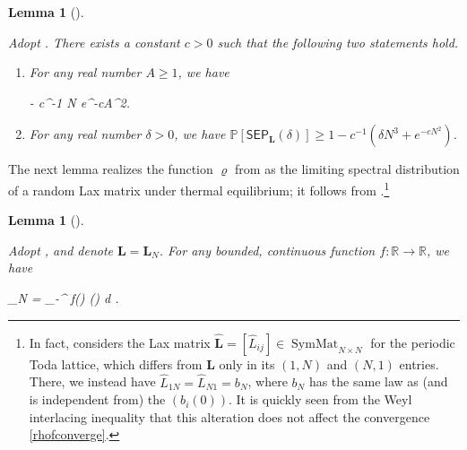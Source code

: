 \documentclass{amsart}
\numberwithin{equation}{section}
\DeclareMathOperator{\eig}{eig}
\DeclareMathOperator{\SymMat}{SymMat}
\newtheorem{lem}[thm]{Lemma}
\theoremstyle{remark}
\theoremstyle{definition}
\begin{document}
	\begin{lem}[{\cite[Lemmas 3.15 and 3.18]{LC}}]
		\label{l0eigenvalues}
		
		Adopt . There exists a constant $c > 0$ such that the following two statements hold. 
		
		\begin{enumerate} 
			\item For any real number $A \ge 1$, we have 
		\begin{flalign*} 
			   - c^{-1} N e^{-cA^2}.
		\end{flalign*} 
		
		\item For any real number $\delta > 0$, we have $\mathbb{P} [ \mathsf{SEP}_{\bm{L}} (\delta) ] \ge 1 - c^{-1} (\delta N^3 + e^{-cN^2})$.
		\end{enumerate} 
		
	\end{lem} 
	
	The next lemma realizes the function $\varrho$ from  as the limiting spectral distribution of a random Lax matrix under thermal equilibrium; it follows from \cite[Lemma 4.3]{DSME}.\footnote{In fact, \cite{DSME} considers the Lax matrix $\hat{\bm{L}} = [\hat{L}_{ij}] \in \SymMat_{N \times N}$ for the periodic Toda lattice, which differs from $\bm{L}$ only in its $(1,N)$ and $(N,1)$ entries. There, we instead have $\hat{L}_{1N} = \hat{L}_{N1} = b_N$, where $b_N$ has the same law as (and is independent from) the $(b_i(0))$. It is quickly seen from the Weyl interlacing inequality that this alteration does not affect the convergence \eqref{rhofconverge}.}
	
	
	\begin{lem}[{\cite[Lemma 4.3]{DSME}}]
		
		\label{lf} 
		
		Adopt , and denote $\bm{L} = \bm{L}_N$. For any bounded, continuous function $f : \mathbb{R} \rightarrow \mathbb{R}$, we have
		\begin{flalign}
			\label{rhofconverge}
			\displaystyle\lim_{N\rightarrow \infty}  \Bigg[ \displaystyle\frac{1}{N} \cdot \displaystyle\sum_{\lambda \in \eig \bm{L}_N} f(\lambda) \Bigg] = \displaystyle\int_{-\infty}^{\infty} f(\lambda) \varrho(\lambda) d \lambda.
		\end{flalign}
		
	\end{lem} 
	
\end{document}

